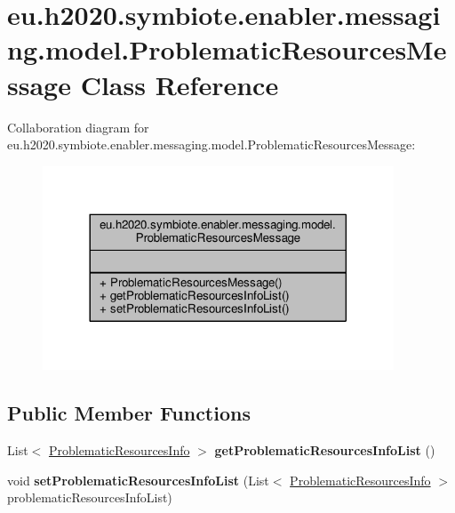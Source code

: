 \hypertarget{classeu_1_1h2020_1_1symbiote_1_1enabler_1_1messaging_1_1model_1_1ProblematicResourcesMessage}{}\section{eu.\+h2020.\+symbiote.\+enabler.\+messaging.\+model.\+Problematic\+Resources\+Message Class Reference}
\label{classeu_1_1h2020_1_1symbiote_1_1enabler_1_1messaging_1_1model_1_1ProblematicResourcesMessage}


Collaboration diagram for eu.\+h2020.\+symbiote.\+enabler.\+messaging.\+model.\+Problematic\+Resources\+Message\+:
\nopagebreak
\begin{figure}[H]
\begin{center}
\leavevmode
\includegraphics[width=296pt]{classeu_1_1h2020_1_1symbiote_1_1enabler_1_1messaging_1_1model_1_1ProblematicResourcesMessage__coll__graph}
\end{center}
\end{figure}
\subsection*{Public Member Functions}
\begin{DoxyCompactItemize}
\item 
\mbox{\label{classeu_1_1h2020_1_1symbiote_1_1enabler_1_1messaging_1_1model_1_1ProblematicResourcesMessage_a9d3d07966c2f650a4c37af91830b6264}} 
List$<$ \hyperlink{classeu_1_1h2020_1_1symbiote_1_1enabler_1_1messaging_1_1model_1_1ProblematicResourcesInfo}{Problematic\+Resources\+Info} $>$ {\bfseries get\+Problematic\+Resources\+Info\+List} ()
\item 
\mbox{\label{classeu_1_1h2020_1_1symbiote_1_1enabler_1_1messaging_1_1model_1_1ProblematicResourcesMessage_aec33e6c29156da3916d2b8e5d1900a41}} 
void {\bfseries set\+Problematic\+Resources\+Info\+List} (List$<$ \hyperlink{classeu_1_1h2020_1_1symbiote_1_1enabler_1_1messaging_1_1model_1_1ProblematicResourcesInfo}{Problematic\+Resources\+Info} $>$ problematic\+Resources\+Info\+List)
\end{DoxyCompactItemize}


